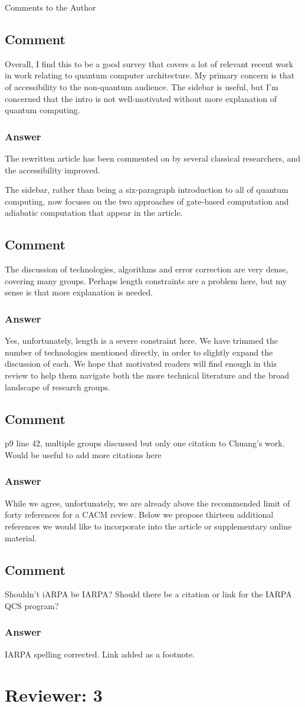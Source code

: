 \documentclass{article}
\newcommand{\comment}{\subsection{Comment}\em}
\newcommand{\answer}{\rm \subsubsection*{Answer}}
\begin{document}
Comments to the Author

\comment

Overall, I find this to be a good survey that covers a lot of relevant
recent work in work relating to quantum computer architecture.
My primary concern is that of accessibility to the non-quantum audience.
The sidebar is useful, but I'm concerned that the intro is not well-motivated
without more explanation of quantum computing.  

\answer

The rewritten article has been commented on by several classical
researchers, and the accessibility improved.

The sidebar, rather than being a six-paragraph introduction to all of
quantum computing, now focuses on the two approaches of gate-based
computation and adiabatic computation that appear in the article.

\comment

The discussion of technologies, algorithms and error correction are very
dense, covering many groups.  Perhaps length constraints are a problem
here, but my sense is that more explanation is needed.

\answer

Yes, unfortunately, length is a severe constraint here.  We have
trimmed the number of technologies mentioned directly, in order to
slightly expand the discussion of each.  We hope that motivated readers
will find enough in this review to help them navigate both the more
technical literature and the broad landscape of research groups.

\comment

p9 line 42, multiple groups discussed but only one citation to Chuang's work.
Would be useful to add more citations here

\answer

While we agree, unfortunately, we are already above the recommended
limit of forty references for a CACM review.  Below we propose
thirteen additional references we would like to incorporate into the
article or supplementary online material.

\comment

Shouldn't iARPA be IARPA?  Should there be a citation or link
for the IARPA QCS program?

\answer

IARPA spelling corrected.  Link added as a footnote.

\section{Reviewer: 3}
\end{document}
